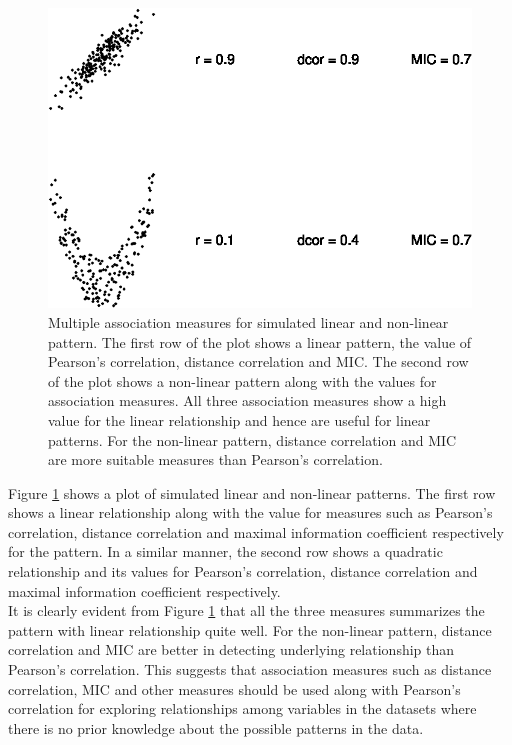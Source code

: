 \begin{Schunk}
\begin{figure}

{\centering \includegraphics{rj_paper_files/figure-latex/motivation-patterns-1} 

}

\caption[Multiple association measures for simulated linear and non-linear pattern]{Multiple association measures for simulated linear and non-linear pattern. The first row of the plot shows a linear pattern, the value of Pearson's correlation, distance correlation and MIC. The second row of the plot shows a non-linear pattern along with the values for association measures. All three association measures show a high value for the linear relationship and hence are useful for linear patterns. For the non-linear pattern, distance correlation and MIC are more suitable measures than Pearson's correlation.}\label{fig:motivation-patterns}
\end{figure}
\end{Schunk}

Figure \ref{fig:motivation-patterns} shows a plot of simulated linear
and non-linear patterns. The first row shows a linear relationship along
with the value for measures such as Pearson's correlation, distance
correlation and maximal information coefficient respectively for the
pattern. In a similar manner, the second row shows a quadratic
relationship and its values for Pearson's correlation, distance
correlation and maximal information coefficient respectively.\\
It is clearly evident from Figure \ref{fig:motivation-patterns} that all
the three measures summarizes the pattern with linear relationship quite
well. For the non-linear pattern, distance correlation and MIC are
better in detecting underlying relationship than Pearson's correlation.
This suggests that association measures such as distance correlation,
MIC and other measures should be used along with Pearson's correlation
for exploring relationships among variables in the datasets where there
is no prior knowledge about the possible patterns in the data.

